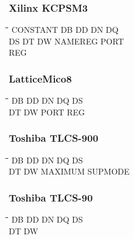 \subsubsection{Xilinx KCPSM3}
{\tt\begin{tabbing}
\hspace{3cm}\=\hspace{3cm}\=\hspace{3cm}\=\hspace{3cm}\=\kill
CONSTANT   \> DB         \> DD          \> DN          \> DQ \\
DS         \> DT         \> DW          \> NAMEREG     \> PORT \\
REG \\
\end{tabbing}}

\subsubsection{LatticeMico8}
{\tt\begin{tabbing}
\hspace{3cm}\=\hspace{3cm}\=\hspace{3cm}\=\hspace{3cm}\=\kill
DB         \> DD          \> DN         \> DQ          \> DS \\
DT         \> DW          \> PORT       \> REG \\
\end{tabbing}}

\subsubsection{Toshiba TLCS-900}
{\tt\begin{tabbing}
\hspace{3cm}\=\hspace{3cm}\=\hspace{3cm}\=\hspace{3cm}\=\kill
DB         \> DD          \> DN         \> DQ          \> DS \\
DT         \> DW          \> MAXIMUM    \> SUPMODE \\
\end{tabbing}}

\subsubsection{Toshiba TLCS-90}
{\tt\begin{tabbing}
\hspace{3cm}\=\hspace{3cm}\=\hspace{3cm}\=\hspace{3cm}\=\kill
DB         \> DD          \> DN         \> DQ          \> DS \\
DT         \> DW \\
\end{tabbing}}

